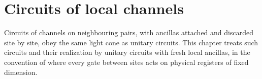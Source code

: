 \chapter{Circuits of local channels}
\label{ch:circuits_channels}

Circuits of channels on neighbouring pairs, with ancillas attached and
discarded site by site, obey the same light cone as unitary circuits. This
chapter treats such circuits and their realization by unitary circuits with
fresh local ancillas, in the convention of \cite{Piroli2021LOCC} where every
gate between sites acts on physical registers of fixed dimension.



